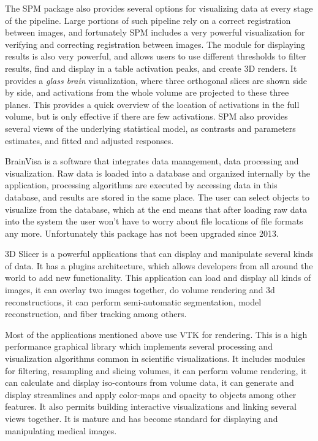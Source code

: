 The SPM package also provides several options for visualizing data at every stage of the pipeline. Large portions of such pipeline rely on a correct registration between images, and fortunately SPM includes a very powerful visualization for verifying and correcting registration between images. The module for displaying results is also very powerful, and allows users to use different thresholds to filter results, find and display in a table activation peaks, and create 3D renders. It provides a \emph{glass brain} visualization, where three orthogonal slices are shown side by side, and activations from the whole volume are projected to these three planes. This provides a quick overview of the location of activations in the full volume, but is only effective if there are few activations. SPM also provides several views of the underlying statistical model, as contrasts and parameters estimates, and fitted and adjusted responses.


BrainVisa \autocite{cointepas_brainvisa:_2001} is a software that integrates data management, data processing and visualization. Raw data is loaded into a database and organized internally by the application, processing algorithms are executed by accessing data in this database, and results are stored in the same place. The user can select objects to visualize from the database, which at the end means that after loading raw data into the system the user won't have to worry about file locations of file formats any more. Unfortunately this package has not been upgraded since 2013.


3D Slicer \autocite{fedorov_3d_2012} is a powerful applications that can display and manipulate several kinds of data. It has a plugins architecture, which allows developers from all around the world to add new functionality. This application can load and display all kinds of images, it can overlay two images together, do volume rendering and 3d reconstructions, it can perform semi-automatic segmentation, model reconstruction, and fiber tracking among others. 


Most of the applications mentioned above use VTK \autocite{schroeder_design_1996} for rendering. This is a high performance graphical library which implements several processing and visualization algorithms common in scientific visualizations. It includes modules for filtering, resampling and slicing volumes, it can perform volume rendering, it can calculate and display iso-contours from volume data, it can generate and display streamlines and apply color-maps and opacity to objects among other features. It also permits building interactive visualizations and linking several views together.
It is mature and has become standard for displaying and manipulating medical images. 

